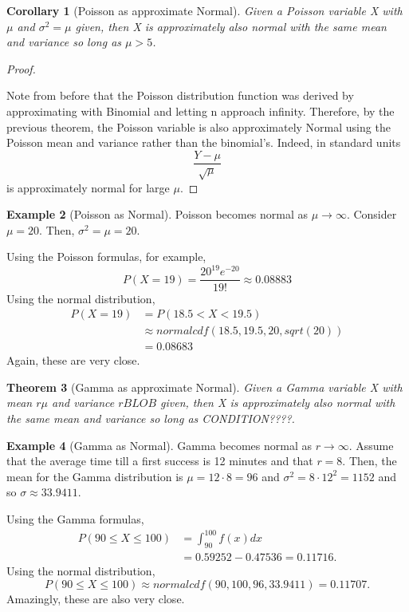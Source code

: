 \documentclass[10pt,]{book}
\theoremstyle{plain}
\newtheorem{theorem}{Theorem}[section]
\newtheorem{corollary}[theorem]{Corollary}
\theoremstyle{definition}
\theoremstyle{definition}
\newtheorem{example}[theorem]{Example}
\theoremstyle{definition}
\numberwithin{equation}{section}
\newcommand{\lt}{ < }
\newcommand{\gt}{ > }
\begin{document}
\begin{corollary}[{Poisson as approximate Normal}]\label{corollary-7}
Given a Poisson variable X with \(\mu\) and \(\sigma^2 = \mu\) given, then X is approximately also normal with the same mean and variance so long as \(\mu \gt 5\).
\end{corollary}
\begin{proof}\hypertarget{proof-60}{}

Note from before that the Poisson distribution function was derived by approximating with Binomial and letting n approach infinity. Therefore, by the previous theorem, the Poisson variable is also approximately Normal using the Poisson mean and variance rather than the binomial's. Indeed, in standard units
\begin{equation*}\frac{Y - \mu}{\sqrt{\mu}}\end{equation*}
is approximately normal for large \(\mu\).
%
\end{proof}
\begin{example}[Poisson as Normal]\label{example-24}
Poisson becomes normal as \( \mu \rightarrow \infty\).  Consider \(\mu = 20\).  Then, \(\sigma^2 = \mu = 20\).   
%
\par
Using the Poisson formulas, for example,
\begin{equation*}P( X = 19 ) = \frac{20^{19} e^{-20}}{19!} \approx 0.08883\end{equation*}
Using the normal distribution,
\begin{align*}
P( X = 19 ) & = P( 18.5 \lt X \lt 19.5) \\
 & \approx normalcdf(18.5,19.5,20,sqrt(20)) \\
 & = 0.08683
\end{align*}
Again, these are very close.
%
\end{example}
\begin{theorem}[{Gamma as approximate Normal}]\label{theorem-65}
Given a Gamma variable X with mean \(r \mu\) and variance \( r BLOB\) given, then X is approximately also normal with the same mean and variance so long as CONDITION????.
\end{theorem}
\begin{example}[Gamma as Normal]\label{example-25}
Gamma becomes normal as \( r \rightarrow \infty\).  Assume that the average time till a first success is 12 minutes and that \(r = 8\).  Then, the mean for the Gamma distribution is \(\mu = 12 \cdot 8 = 96\) and \(\sigma^2 = 8 \cdot 12^2 = 1152\) and so \(\sigma \approx 33.9411\).   
%
\par
Using the Gamma formulas, 
\begin{align*}
P( 90 \le X \le 100 ) & = \int_{90}^{100} f(x) dx \\
 & = 0.59252 - 0.47536 = 0.11716.
\end{align*}
Using the normal distribution,
\begin{equation*}P( 90 \le X \le 100) \approx normalcdf(90,100,96,33.9411) = 0.11707.\end{equation*}
Amazingly, these are also very close.
%
\end{example}
\end{document}
